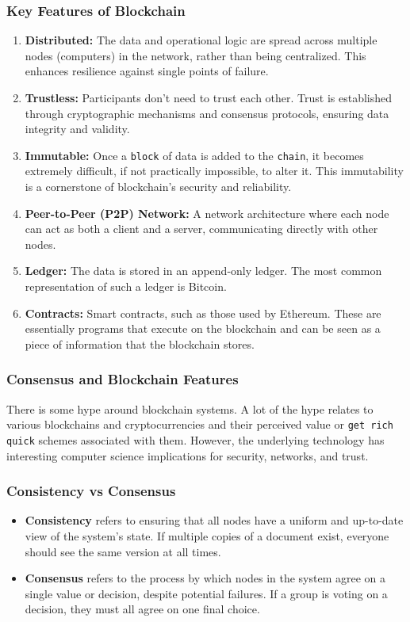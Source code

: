 \subsubsection{Key Features of Blockchain}
\begin{enumerate}[itemsep=1pt, topsep=1pt]
    \item \textbf{Distributed:} The data and operational logic are spread across multiple nodes (computers) in the network, rather than being centralized. This enhances resilience against single points of failure.
    \item \textbf{Trustless:} Participants don't need to trust each other.  Trust is established through cryptographic mechanisms and consensus protocols, ensuring data integrity and validity.
    \item \textbf{Immutable:} Once a \texttt{block} of data is added to the \texttt{chain}, it becomes extremely difficult, if not practically impossible, to alter it. This immutability is a cornerstone of blockchain's security and reliability.
    \item \textbf{Peer-to-Peer (P2P) Network:}  A network architecture where each node can act as both a client and a server, communicating directly with other nodes.
    \item \textbf{Ledger:} The data is stored in an append-only ledger. The most common representation of such a ledger is Bitcoin.
    \item \textbf{Contracts:} Smart contracts, such as those used by Ethereum. These are essentially programs that execute on the blockchain and can be seen as a piece of information that the blockchain stores.
\end{enumerate}

\subsubsection{Consensus and Blockchain Features}
There is some hype around blockchain systems. A lot of the hype relates to various blockchains and cryptocurrencies and their perceived value or \texttt{get rich quick} schemes associated with them. However, the underlying technology has interesting computer science implications for security, networks, and trust.

\subsubsection{Consistency vs Consensus}
\begin{itemize}[itemsep=1pt, topsep=1pt]
    \item \textbf{Consistency} refers to ensuring that all nodes have a uniform and up-to-date view of the system's state. If multiple copies of a document exist, everyone should see the same version at all times.
    \item \textbf{Consensus} refers to the process by which nodes in the system agree on a single value or decision, despite potential failures. If a group is voting on a decision, they must all agree on one final choice.
\end{itemize}

